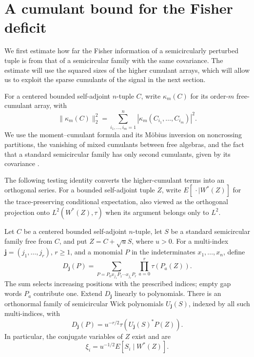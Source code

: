\section{A cumulant bound for the Fisher deficit}\label{sec:fisher}

We first estimate how far the Fisher information of a semicircularly
perturbed tuple is from that of a semicircular family with the same
covariance. The estimate will use the squared sizes of the higher
cumulant arrays, which will allow us to exploit the sparse cumulants
of the signal in the next section.

For a centered bounded self-adjoint $n$-tuple $C$, write $\kappa_m(C)$
for its order-$m$ free-cumulant array, with
\[
 \|\kappa_m(C)\|_2^2
 =\sum_{i_1,\ldots,i_m=1}^n
   |\kappa_m(C_{i_1},\ldots,C_{i_m})|^2.
\]
We use the moment--cumulant formula and its M\"obius inversion on
noncrossing partitions, the vanishing of mixed cumulants between free
algebras, and the fact that a standard semicircular family has only
second cumulants, given by its covariance
\cite[Proposition~11.4, Theorem~11.16, and Examples~11.21]{NS}.

The following testing identity converts the higher-cumulant terms into
an orthogonal series. For a bounded self-adjoint tuple $Z$, write
$E[\,\cdot\mid W^*(Z)]$ for the trace-preserving conditional
expectation, also viewed as the orthogonal
projection onto $L^2(W^*(Z),\tau)$ when its argument belongs only to $L^2$.

\begin{lemma}\label{lem:wick}
Let $C$ be a centered bounded self-adjoint $n$-tuple, let $S$ be a
standard semicircular family free from $C$, and put $Z=C+\sqrt u S$,
where $u>0$. For a multi-index $\mathbf j=(j_1,\ldots,j_r)$, $r\geq1$,
and a monomial $P$ in the indeterminates $x_1,\ldots,x_n$, define
\[
 D_{\mathbf j}(P)
 =\sum_{P=P_0x_{j_1}P_1\cdots x_{j_r}P_r}
       \prod_{a=0}^r\tau(P_a(Z)).
\]
The sum selects increasing positions with the prescribed indices;
empty gap words $P_a$ contribute one. Extend $D_{\mathbf j}$ linearly
to polynomials. There is an orthonormal family of semicircular Wick
polynomials $U_{\mathbf j}(S)$, indexed by all such multi-indices, with
\begin{equation}\label{eq:wicktest}
 D_{\mathbf j}(P)=u^{-r/2}\tau(U_{\mathbf j}(S)^*P(Z)).
\end{equation}
In particular, the conjugate variables of $Z$ exist and are
\[
 \xi_i=u^{-1/2}E[S_i\mid W^*(Z)].
\]
\end{lemma}


